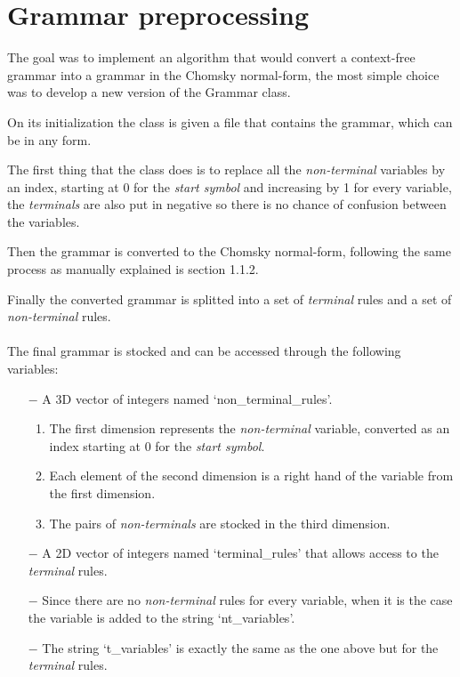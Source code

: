 
\section{Grammar preprocessing}

The goal was to implement an algorithm that would convert a context-free grammar into a grammar in the Chomsky normal-form, the most simple choice was to develop a new version of the Grammar class.

On its initialization the class is given a file that contains the grammar, which can be in any form.

The first thing that the class does is to replace all the \textit{non-terminal} variables by an index, starting at 0 for the \textit{start symbol} and increasing by 1 for every variable, the \textit{terminals} are also put in negative so there is no chance of confusion between the variables.

Then the grammar is converted to the Chomsky normal-form, following the same process as manually explained is section 1.1.2.

Finally the converted grammar is splitted into a set of \textit{terminal} rules and a set of \textit{non-terminal} rules.
\\
\\
The final grammar is stocked and can be accessed through the following variables:

\begin{itemize}
    \item[$-$] A 3D vector of integers named `non\_terminal\_rules'.
        \begin{enumerate}
            \item The first dimension represents the \textit{non-terminal} variable, converted as an index starting at 0 for the \textit{start symbol}.
            \item Each element of the second dimension is a right hand of the variable from the first dimension.
            \item The pairs of \textit{non-terminals} are stocked in the third dimension.
        \end{enumerate}
    \item[$-$] A 2D vector of integers named `terminal\_rules' that allows access to the \textit{terminal} rules.
    \item[$-$] Since there are no \textit{non-terminal} rules for every variable, when it is the case the variable is added to the string `nt\_variables'.
    \item[$-$] The string `t\_variables' is exactly the same as the one above but for the \textit{terminal} rules.
\end{itemize}

